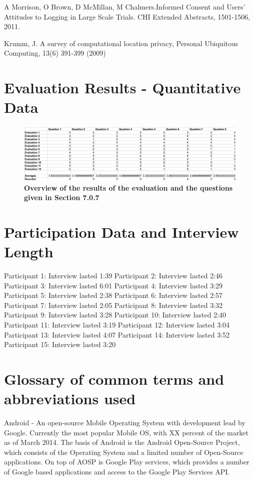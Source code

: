 \documentclass{l4proj}
\begin{document}
A Morrison, O Brown, D McMillan, M Chalmers.Informed Consent and Users' Attitudes to Logging in Large Scale Trials. CHI Extended Abstracts, 1501-1506, 2011.

Krumm, J. A survey of computational location privacy, Personal Ubiquitous Computing, 13(6) 391-399 (2009)


\section{Evaluation Results - Quantitative Data}

\begin{figure}[ht!]
\centering
\includegraphics[scale=0.4]{images/screenshots/resultsscreen.png}
\caption{\textbf{Overview of the results of the evaluation and the questions given in Section 7.0.7}}
\label{apndx:resultsscreen}
\end{figure}

\section{Participation Data and Interview Length}

Participant 1: Interview lasted 1:39 
Participant 2: Interview lasted 2:46
Participant 3: Interview lasted 6:01
Participant 4: Interview lasted 3:29
Participant 5: Interview lasted 2:38
Participant 6: Interview lasted 2:57
Participant 7: Interview lasted 2:05
Participant 8: Interview lasted 3:32
Participant 9: Interview lasted 3:28
Participant 10: Interview lasted 2:40
Participant 11: Interview lasted 3:19
Participant 12: Interview lasted 3:04
Participant 13: Interview lasted 4:07
Participant 14: Interview lasted 3:52
Participant 15: Interview lasted 3:20
 
\section{Glossary of common terms and abbreviations used}

Android - An open-source Mobile Operating System with development lead by Google. Currently the most popular Mobile OS, with XX percent of the market as of March 2014. The basis of Android is the Android Open-Source Project, which consists of the Operating System and a limited number of Open-Source applications. On top of AOSP is Google Play services, which provides a number of Google based applications and access to the Google Play Services API.
\end{document}
